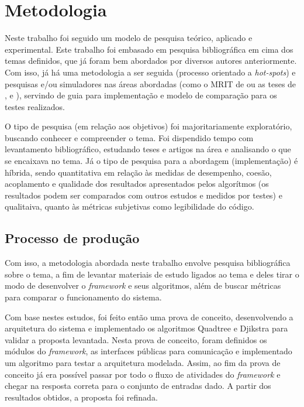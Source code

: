 \chapter[Metodologia]{Metodologia}

Neste trabalho foi seguido um modelo de pesquisa teórico, aplicado e experimental. Este trabalho foi embasado em pesquisa bibliográfica em cima dos temas definidos, que já foram bem abordados por diversos autores anteriormente. Com isso, já há uma metodologia a ser seguida (processo orientado a \textit{hot-spots}) e pesquisas e/ou simuladores nas áreas abordadas (como o MRIT de \cite{Guzman2008} ou as teses de \cite{Souza2008}, \cite{Thomsen2010} e \cite{Strandberg2004}), servindo de guia para implementação e modelo de comparação para os testes realizados.

O tipo de pesquisa (em relação aos objetivos) foi majoritariamente exploratório, buscando conhecer e compreender o tema. Foi dispendido tempo com levantamento bibliográfico, estudando teses e artigos na área e analisando o que se encaixava no tema. Já o tipo de pesquisa para a abordagem (implementação) é híbrida, sendo quantitativa em relação às medidas de desempenho, coesão, acoplamento e qualidade dos resultados apresentados pelos algorítmos (os resultados podem ser comparados com outros estudos e medidos por testes) e qualitaiva, quanto às métricas subjetivas como legibilidade do código.

\section{Processo de produção}

Com isso, a metodologia abordada neste trabalho envolve pesquisa bibliográfica sobre o tema, a fim de levantar materiais de estudo ligados ao tema e deles tirar o modo de desenvolver o \textit{framework} e seus algoritmos, além de buscar métricas para comparar o funcionamento do sistema. 

Com base nestes estudos, foi feito então uma prova de conceito, desenvolvendo a arquitetura do sistema e implementado os algoritmos Quadtree e Djikstra para validar a proposta levantada. Nesta prova de conceito, foram definidos os módulos do \textit{framework}, as interfaces públicas para comunicação e implementado um algoritmo para testar a arquitetura modelada. Assim, ao fim da prova de conceito já era possível passar por todo o fluxo de atividades do \textit{framework} e chegar na resposta correta para o conjunto de entradas dado. A partir dos resultados obtidos, a proposta foi refinada.

